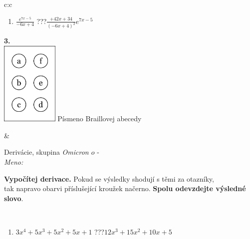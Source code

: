 \documentclass[10pt]{report}
\newcommand\omicron{o}
\begin{document}
\begin{tabular}{c:c}
\begin{minipage}[c][104.5mm][t]{0.5\linewidth}
\begin{center}
\begin{minipage}{0.79\linewidth}
\begin{center}
\begin{varwidth}{\linewidth}
\begin{enumerate}
\item $\frac{e^{7x-5}}{-6x+4}$\quad \dotfill\; ???\;\dotfill \quad $\frac{+42x+34}{(-6x+4)^2}e^{7x-5}$
\end{enumerate}
\end{varwidth}
\end{center}
\end{minipage}
\begin{minipage}{0.20\linewidth}
\begin{center}
{\Huge\bfseries 3.} \\[2mm]
\includegraphics[height=40mm]{../images/braille.png}
{\small Písmeno Braillovej abecedy}
\end{center}
\end{minipage}
\end{center}
\end{minipage}
&
\begin{minipage}[c][104.5mm][t]{0.5\linewidth}
\begin{center}
\vspace{7mm}
{\huge Derivácie, skupina \textit{Omicron $\omicron$} -}\\[5mm]
\textit{Meno:}\phantom{xxxxxxxxxxxxxxxxxxxxxxxxxxxxxxxxxxxxxxxxxxxxxxxxxxxxxxxxxxxxxxxxx}\\[5mm]
\begin{minipage}{0.95\linewidth}
\begin{center}
\textbf{Vypočítej derivace.} Pokud se výsledky shodují s těmi za otazníky,\\tak napravo obarvi příslušející kroužek načerno. \textbf{Spolu odevzdejte výsledné slovo}.
\end{center}
\end{minipage}
\\[1mm]
\begin{minipage}{0.79\linewidth}
\begin{center}
\begin{varwidth}{\linewidth}
\begin{enumerate}
\normalsize
\item $3x^4+5x^3+5x^2+5x+1$\quad \dotfill\; ???\;\dotfill \quad $12x^3+15x^2+10x+5$

\end{enumerate}
\end{varwidth}
\end{center}
\end{minipage}
\end{center}
\end{minipage}
\end{tabular}
\end{document}
